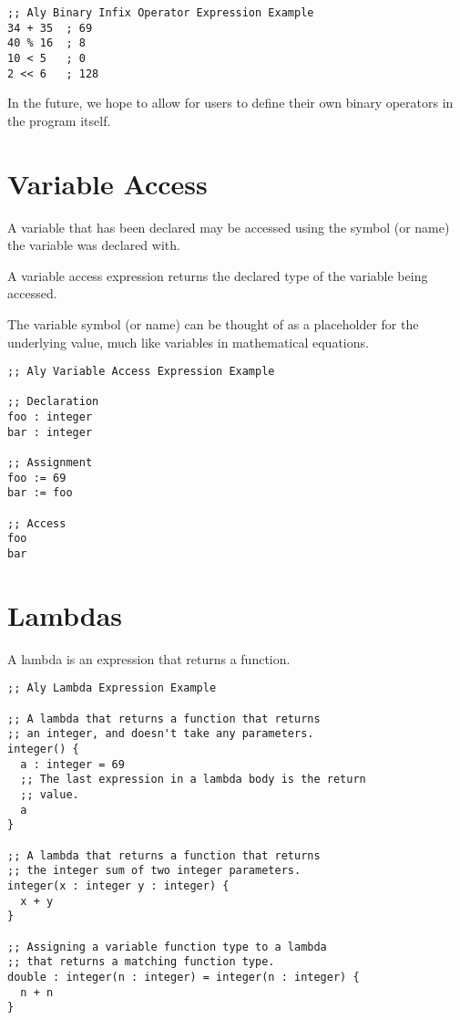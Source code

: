 \documentclass[12pt]{report}
\begin{document}
\begin{Verbatim}[samepage=true]
;; Aly Binary Infix Operator Expression Example
34 + 35  ; 69
40 % 16  ; 8
10 < 5   ; 0
2 << 6   ; 128
\end{Verbatim}

In the future, we hope to allow for users to define their own binary operators in the program itself.


\section{Variable Access}
\label{subsec:expressions-variable-access}

A variable that has been declared may be accessed using the symbol (or name) the variable was declared with.

A variable access expression returns the declared type of the variable being accessed.

The variable symbol (or name) can be thought of as a placeholder for the underlying value, much like variables in mathematical equations.

\begin{Verbatim}[samepage=true]
;; Aly Variable Access Expression Example

;; Declaration
foo : integer
bar : integer

;; Assignment
foo := 69
bar := foo

;; Access
foo
bar
\end{Verbatim}

\section{Lambdas}
\label{subsec:expressions-lambdas}

A lambda is an expression that returns a function.

\begin{Verbatim}[samepage=true]
;; Aly Lambda Expression Example

;; A lambda that returns a function that returns
;; an integer, and doesn't take any parameters.
integer() {
  a : integer = 69
  ;; The last expression in a lambda body is the return
  ;; value.
  a
}

;; A lambda that returns a function that returns
;; the integer sum of two integer parameters.
integer(x : integer y : integer) {
  x + y
}

;; Assigning a variable function type to a lambda
;; that returns a matching function type.
double : integer(n : integer) = integer(n : integer) {
  n + n
}
\end{Verbatim}
\end{document}
